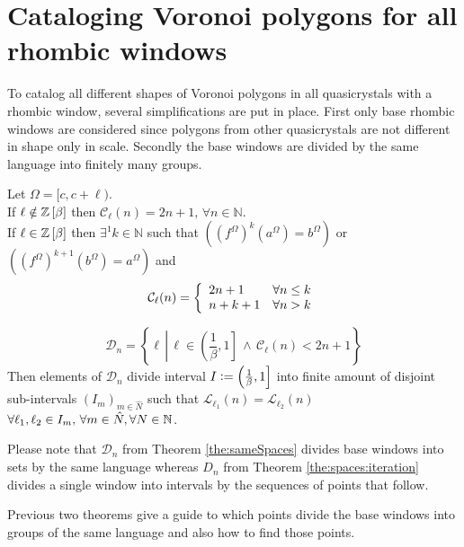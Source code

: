 \documentclass[text.tex]{subfiles}
\begin{document}
\section{Cataloging Voronoi polygons for all rhombic windows}

To catalog all different shapes of Voronoi polygons in all quasicrystals with a rhombic window, several simplifications are put in place.
First only base rhombic windows are considered since polygons from other quasicrystals are not different in shape only in scale. Secondly the base windows are divided by the same language into finitely many groups. 

\begin{theorem}
\label{the:complexity}
Let $\Omega = [c,c+\ell)$.\\
If $\ell \notin \mathbb{Z}\left[\beta\right]$ then $\mathcal{C}_{\ell}(n) = 2n+1,\, \forall n\in\mathbb{N}$. \\
If $\ell \in \mathbb{Z}\left[\beta\right]$ then $\exists^1 k \in \mathbb{N}$ such that $\left({(f^\Omega)}^{k}(a^\Omega) = b^\Omega\right)$ or $\left({(f^\Omega)}^{k+1}(b^\Omega) = a^\Omega\right)$ and 
$$\mathcal{C}_{\ell}(n) = \left\{
	\begin{array}{l l}
		2n+1	&	\forall n\leq k \\
		n+k+1	&	\forall n > k
	\end{array}
	\right.
$$
\end{theorem}

\begin{theorem}
\label{the:sameSpaces}
$$\mathcal{D}_n = \left\{ \ell\,\left|\, \ell\in \left(\frac{1}{\beta},1\right] \,\wedge\, \mathcal{C}_\ell(n) < 2n+1 \right.\right\}$$
Then elements of $\mathcal{D}_n$ divide interval $I \vcentcolon= \left(\frac{1}{\beta},1\right]$ into finite amount of disjoint sub-intervals $(I_m)_{m\in\widehat{N}}$ such that $\mathcal{L}_{\ell_1}(n) = \mathcal{L}_{\ell_2}(n)$ $\forall \ell_1, \ell_2 \in I_m,\, \forall m\in\hat{N}, \forall N\in\mathbb{N}$.
\end{theorem}

\begin{remark}
Please note that $\mathcal{D}_n$ from Theorem \ref{the:sameSpaces} divides base windows into sets by the same language whereas $D_n$ from Theorem \ref{the:spaces:iteration} divides a single window into intervals by the sequences of points that follow.
\end{remark}

Previous two theorems give a guide to which points divide the base windows into groups of the same language and also how to find those points. 
\end{document}
